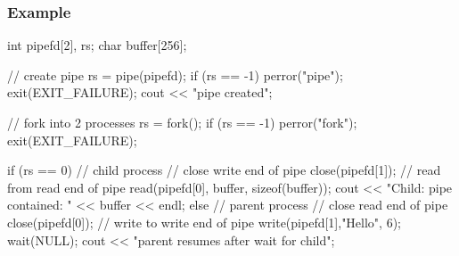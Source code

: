 \documentclass{report}
\begin{document}
        \subsubsection{Example}
        \bigbreak \noindent 
        \begin{cppcode}
            int pipefd[2], rs;
            char buffer[256];

            // create pipe
            rs = pipe(pipefd);
            if (rs == -1) { perror("pipe"); exit(EXIT_FAILURE); }
            cout << "pipe created\n";

            // fork into 2 processes
            rs = fork();
            if (rs == -1) { perror("fork"); exit(EXIT_FAILURE); }

            if (rs == 0) { // child process	
                // close write end of pipe
                close(pipefd[1]);
                // read from read end of pipe
                read(pipefd[0], buffer, sizeof(buffer));
                cout << "Child: pipe contained: " << buffer << endl;			
            } else {  // parent process	
                // close read end of pipe
                close(pipefd[0]);
                // write to write end of pipe
                write(pipefd[1],"Hello", 6);
                wait(NULL);	
                cout << "parent resumes after wait for child\n";
            }	
        \end{cppcode}

        

    




    
    

    
\end{document}
